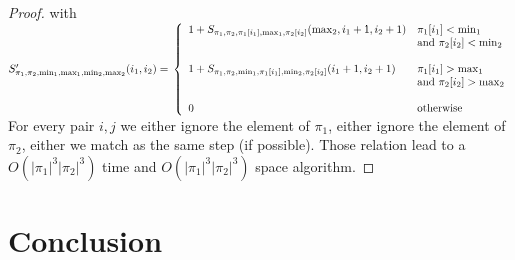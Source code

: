 \documentclass[a4paper]{llncs}
\begin{document}
\begin{proof}
	with 
	$S'_{\pi_1,\pi_2,\min_1,\max_1,\min_2,\max_2}(i_1,i_2)=\\ \left\{ 
				\begin{array}{l l}
					1+S_{\pi_1,\pi_2,\pi_1[i_1],\max_1,\pi_2[i_2]}(\max_2,i_1+1,i_2+1)  & \text{$\pi_1[i_1]<\min_1$ } \\
					& \text{and $\pi_2[i_2]<\min_2$} \\
					&\\
					1+S_{\pi_1,\pi_2,\min_1,\pi_1[i_1],\min_2,\pi_2[i_2]}(i_1+1,i_2+1)  & \text{$\pi_1[i_1]>\max_1$ } \\	
					&\text{and $\pi_2[i_2]>\max_2$}\\	
					&\\	
					0 & \text{otherwise}\\							
				\end{array} \right.$\\
				
	For every pair $i,j$ we either ignore the element of $\pi_1$,
	either ignore the element of $\pi_2$, 
	either we match as the same step (if possible).
	Those relation lead to a $O(|\pi_1|^3|\pi_2|^3)$ time and $O(|\pi_1|^3|\pi_2|^3)$ space algorithm.		
	\end{proof}


			
%		
%		
	
	
		
	\section{Conclusion}
		


		  					
{}
	
			
				      
\end{document}
